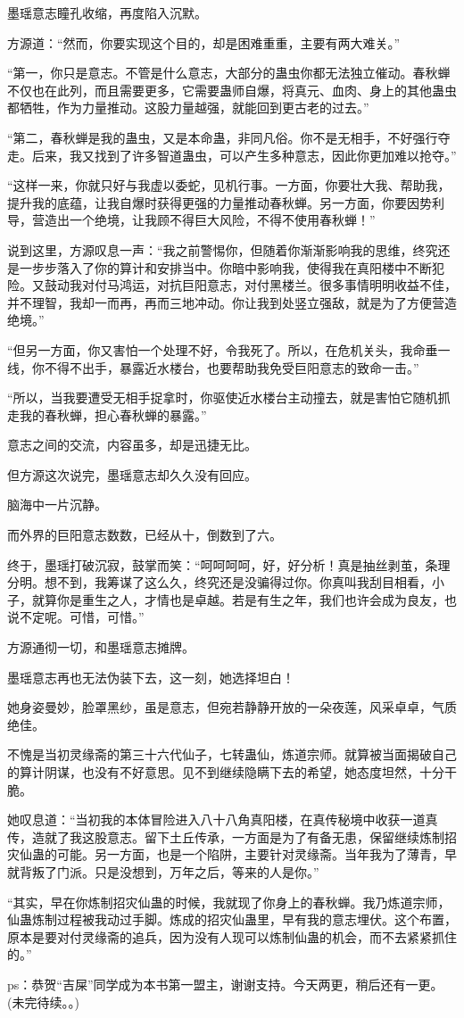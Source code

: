 \begin{this_body}
墨瑶意志瞳孔收缩，再度陷入沉默。

方源道：“然而，你要实现这个目的，却是困难重重，主要有两大难关。”

“第一，你只是意志。不管是什么意志，大部分的蛊虫你都无法独立催动。春秋蝉不仅也在此列，而且需要更多，它需要蛊师自爆，将真元、血肉、身上的其他蛊虫都牺牲，作为力量推动。这股力量越强，就能回到更古老的过去。”

“第二，春秋蝉是我的蛊虫，又是本命蛊，非同凡俗。你不是无相手，不好强行夺走。后来，我又找到了许多智道蛊虫，可以产生多种意志，因此你更加难以抢夺。”

“这样一来，你就只好与我虚以委蛇，见机行事。一方面，你要壮大我、帮助我，提升我的底蕴，让我自爆时获得更强的力量推动春秋蝉。另一方面，你要因势利导，营造出一个绝境，让我顾不得巨大风险，不得不使用春秋蝉！”

说到这里，方源叹息一声：“我之前警惕你，但随着你渐渐影响我的思维，终究还是一步步落入了你的算计和安排当中。你暗中影响我，使得我在真阳楼中不断犯险。又鼓动我对付马鸿运，对抗巨阳意志，对付黑楼兰。很多事情明明收益不佳，并不理智，我却一而再，再而三地冲动。你让我到处竖立强敌，就是为了方便营造绝境。”

“但另一方面，你又害怕一个处理不好，令我死了。所以，在危机关头，我命垂一线，你不得不出手，暴露近水楼台，也要帮助我免受巨阳意志的致命一击。”

“所以，当我要遭受无相手捉拿时，你驱使近水楼台主动撞去，就是害怕它随机抓走我的春秋蝉，担心春秋蝉的暴露。”

意志之间的交流，内容虽多，却是迅捷无比。

但方源这次说完，墨瑶意志却久久没有回应。

脑海中一片沉静。

而外界的巨阳意志数数，已经从十，倒数到了六。

终于，墨瑶打破沉寂，鼓掌而笑：“呵呵呵呵，好，好分析！真是抽丝剥茧，条理分明。想不到，我筹谋了这么久，终究还是没骗得过你。你真叫我刮目相看，小子，就算你是重生之人，才情也是卓越。若是有生之年，我们也许会成为良友，也说不定呢。可惜，可惜。”

方源通彻一切，和墨瑶意志摊牌。

墨瑶意志再也无法伪装下去，这一刻，她选择坦白！

她身姿曼妙，脸罩黑纱，虽是意志，但宛若静静开放的一朵夜莲，风采卓卓，气质绝佳。

不愧是当初灵缘斋的第三十六代仙子，七转蛊仙，炼道宗师。就算被当面揭破自己的算计阴谋，也没有不好意思。见不到继续隐瞒下去的希望，她态度坦然，十分干脆。

她叹息道：“当初我的本体冒险进入八十八角真阳楼，在真传秘境中收获一道真传，造就了我这股意志。留下土丘传承，一方面是为了有备无患，保留继续炼制招灾仙蛊的可能。另一方面，也是一个陷阱，主要针对灵缘斋。当年我为了薄青，早就背叛了门派。只是没想到，万年之后，等来的人是你。”

“其实，早在你炼制招灾仙蛊的时候，我就现了你身上的春秋蝉。我乃炼道宗师，仙蛊炼制过程被我动过手脚。炼成的招灾仙蛊里，早有我的意志埋伏。这个布置，原本是要对付灵缘斋的追兵，因为没有人现可以炼制仙蛊的机会，而不去紧紧抓住的。”

ps：恭贺“吉屎”同学成为本书第一盟主，谢谢支持。今天两更，稍后还有一更。(未完待续。。)

\end{this_body}


